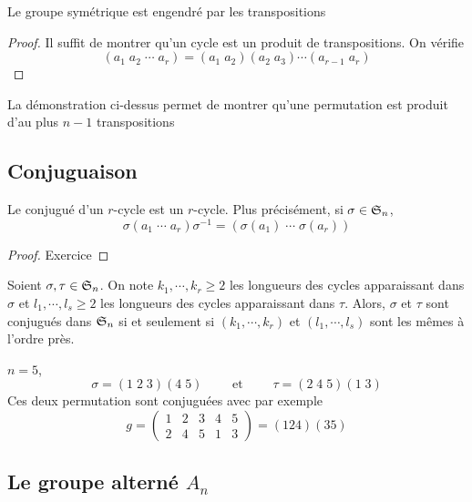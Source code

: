 \begin{thm}
Le groupe symétrique est engendré par les transpositions
\end{thm}

\begin{proof}
    Il suffit de montrer qu'un cycle est un produit de transpositions. On vérifie \[(a_1\;a_2\;\cdots \;a_r)=(a_1\;a_2)(a_2\;a_3)\cdots (a_{r-1}\;a_r)\]
\end{proof}

\begin{rem}
La démonstration ci-dessus permet de montrer qu'une permutation est produit d'au plus $n-1$ transpositions
\end{rem}

\subsection{Conjuguaison}

\begin{prop}
    Le conjugué d'un $r$-cycle est un $r$-cycle. Plus précisément, si $\sigma \in \mathfrak S_n$, \[\sigma (a_1\;\cdots \;a_r)\sigma ^{-1} = (\sigma(a_1)\; \cdots \;\sigma(a_r))\]
\end{prop}

\begin{proof}
Exercice
\end{proof}

\begin{thm}
    Soient $\sigma, \tau \in  \mathfrak S_n$. On note $k_1, \cdots , k_r\geq 2$ les longueurs des cycles apparaissant dans $\sigma$ et $l_1, \cdots , l_s\geq 2$ les longueurs des cycles apparaissant dans $\tau$. Alors, $\sigma$ et $\tau$ sont conjugués dans $\mathfrak S_n$ si et seulement si $(k_1, \cdots , k_r)$ et $(l_1, \cdots , l_s)$ sont les mêmes à l'ordre près.
\end{thm}

\begin{ex}
$n=5$,  \[
    \sigma=(1\;2\;3)(4\;5) \qquad  \text{ et }\qquad  \tau = (2\;4\;5)(1\;3)
\] 
Ces deux permutation sont conjuguées avec par exemple \[g = \begin{pmatrix}1&2&3&4&5\\2&4&5&1&3\end{pmatrix} = (1 2 4)(3 5)\]
\end{ex}

\subsection{Le groupe alterné \texorpdfstring{$A_n$}{An}}

